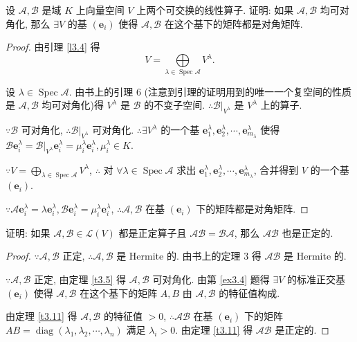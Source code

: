 \documentclass{ctexart}
\begin{document}
\begin{exercise}[3.4]\label{ex3.4}
    设 $\mathcal{A},\mathcal{B}$ 是域 $K$ 上向量空间 $V$ 上两个可交换的线性算子. 证明: 如果 $\mathcal{A},\mathcal{B}$ 均可对角化, 那么 $\exists V$ 的基 $(\boldsymbol{e}_i)$ 使得 $\mathcal{A},\mathcal{B}$ 在这个基下的矩阵都是对角矩阵.
\end{exercise}
\begin{proof}
    由引理 \ref{l3.4} 得
    \[V=\bigoplus\limits_{\lambda\in\operatorname{Spec}\mathcal{A}}V^\lambda.\]

    设 $\lambda\in\operatorname{Spec}\mathcal{A}$. 由书上的引理 6 (注意到引理的证明用到的唯一一个复空间的性质是 $\mathcal{A},\mathcal{B}$ 均可对角化)得 $V^\lambda$ 是 $\mathcal{B}$ 的不变子空间. $\therefore\mathcal{B}|_{V^\lambda}$ 是 $V^\lambda$ 上的算子.
    
    $\because\mathcal{B}$ 可对角化, $\therefore\mathcal{B}|_{V^\lambda}$ 可对角化. $\therefore\exists V^\lambda$ 的一个基 $\boldsymbol{e}^\lambda_1,\boldsymbol{e}^\lambda_2,\cdots,\boldsymbol{e}^\lambda_{m_\lambda}$ 使得 $\mathcal{B}\boldsymbol{e}^\lambda_i=\mathcal{B}|_{V^\lambda}\boldsymbol{e}^\lambda_i=\mu^\lambda_i\boldsymbol{e}^\lambda_i,\mu^\lambda_i\in K$.

    $\because V=\bigoplus\limits_{\lambda\in\operatorname{Spec}\mathcal{A}}V^\lambda$, $\therefore$ 对 $\forall\lambda\in\operatorname{Spec}\mathcal{A}$ 求出 $\boldsymbol{e}^\lambda_1,\boldsymbol{e}^\lambda_2,\cdots,\boldsymbol{e}^\lambda_{m_\lambda}$, 合并得到 $V$ 的一个基 $(\boldsymbol{e}_i)$.

    $\because\mathcal{A}\boldsymbol{e}^\lambda_i=\lambda\boldsymbol{e}^\lambda_i,\mathcal{B}\boldsymbol{e}^\lambda_i=\mu^\lambda_i\boldsymbol{e}^\lambda_i$, $\therefore\mathcal{A},\mathcal{B}$ 在基 $(\boldsymbol{e}_i)$ 下的矩阵都是对角矩阵.
\end{proof}
\begin{exercise}[3.5]
    证明: 如果 $\mathcal{A},\mathcal{B}\in\mathcal{L}(V)$ 都是正定算子且 $\mathcal{AB}=\mathcal{BA}$, 那么 $\mathcal{AB}$ 也是正定的.
\end{exercise}
\begin{proof}
    $\because\mathcal{A},\mathcal{B}$ 正定, $\therefore\mathcal{A},\mathcal{B}$ 是 Hermite 的. 由书上的定理 3 得 $\mathcal{AB}$ 是 Hermite 的.

    $\because\mathcal{A},\mathcal{B}$ 正定, 由定理 \ref{t3.5} 得 $\mathcal{A},\mathcal{B}$ 可对角化. 由第 \ref{ex3.4} 题得 $\exists V$ 的标准正交基 $(\boldsymbol{e}_i)$ 使得 $\mathcal{A},\mathcal{B}$ 在这个基下的矩阵 $A,B$ 由 $\mathcal{A},\mathcal{B}$ 的特征值构成.
    
    由定理 \ref{t3.11} 得 $\mathcal{A},\mathcal{B}$ 的特征值 $>0$, $\therefore\mathcal{AB}$ 在基 $(\boldsymbol{e}_i)$ 下的矩阵 $AB=\operatorname{diag}(\lambda_1,\lambda_2,\cdots,\lambda_n)$ 满足 $\lambda_i>0$. 由定理 \ref{t3.11} 得 $\mathcal{AB}$ 是正定的.
\end{proof}
\end{document}
